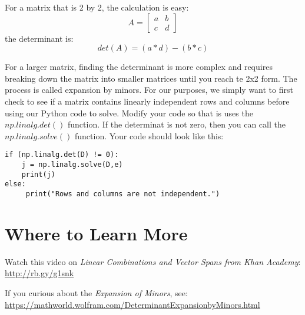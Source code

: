 For a matrix that is 2 by 2, the calculation is easy:
$$A = 
\begin{bmatrix}
a &b  \\
c &d 
\end{bmatrix}
$$
the determinant is:
$$det(A) = (a*d)-(b*c)$$

For a larger matrix, finding the determinant is more complex and requires breaking down the matrix into smaller matrices until you reach te 2x2 form. The process is called expansion by minors. For our purposes, we simply want to first check to see if a matrix contains linearly independent rows and columns before using our Python code to solve. Modify your code so that is uses the $np.linalg.det()$ function. If the determinat is not zero, then you can call the $np.linalg.solve()$ function. Your code should look like this:
\begin{Verbatim}
if (np.linalg.det(D) != 0):
    j = np.linalg.solve(D,e)
    print(j)
else:
     print("Rows and columns are not independent.")
\end{Verbatim}

\section{Where to Learn More}
Watch this video on \emph {Linear Combinations and Vector Spans from Khan Academy}: \url{http://rb.gy/g1snk}

If you curious about the \emph {Expansion of Minors}, see:
\url {https://mathworld.wolfram.com/DeterminantExpansionbyMinors.html}